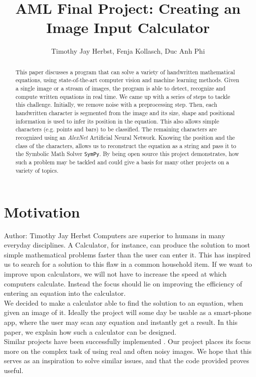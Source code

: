 \documentclass[11pt]{article}
\title{AML Final Project: Creating an Image Input Calculator} %
\author{Timothy Jay Herbst, Fenja Kollasch, Duc Anh Phi}
\begin{document}
	\maketitle
	
	\begin{abstract}
		This paper discusses a program that can solve a variety of handwritten mathematical equations, using state-of-the-art computer vision and machine learning methods.
		Given a single image or a stream of images, the program is able to detect, recognize and compute written equations in real time.
		We came up with a series of steps to tackle this challenge.
		Initially, we remove noise with a preprocessing step.
		Then, each handwritten character is segmented from the image and its size, shape and positional information is used to infer its position in the equation.
		This also allows simple characters (e.g. points and bars) to be classified.
		The remaining characters are recognized using an \textit{AlexNet} Artificial Neural Network.
		Knowing the position and the class of the characters, allows us to reconstruct the equation as a string and pass it to the Symbolic Math Solver \texttt{SymPy}.
		By being open source this project demonstrates, how such a problem may be tackled and could give a basis for many other projects on a variety of topics.
		
		
		
	\end{abstract}
	\newpage
	
	\tableofcontents
	
	\newpage
	\section{Motivation}
	\small{Author: Timothy Jay Herbst} \newline \newline
	Computers are superior to humans in many everyday disciplines.
	A Calculator, for instance, can produce the solution to most simple mathematical problems faster than the user can enter it.
	This has inspired us to search for a solution to this flaw in a common household item.
	If we want to improve upon calculators, we will not have to increase the speed at which computers calculate.
	Instead the focus should lie on improving the efficiency of entering an equation into the calculator.\\
	We decided to make a calculator able to find the solution to an equation, when given an image of it.
	Ideally the project will some day be usable as a smart-phone app, where the user may scan any equation and instantly get a result.
	In this paper, we explain how such a calculator can be designed.\\ Similar projects have been successfully implemented \cite{inspired-blog}. Our project places its focus more on the complex task of using real and often noisy images.
	We hope that this serves as an inspiration to solve similar issues, and that the code provided proves useful.
	
\end{document}
